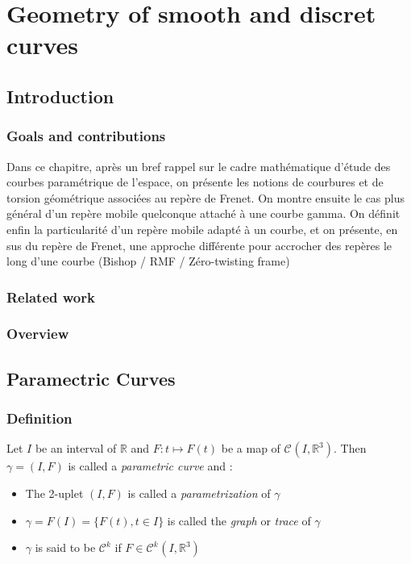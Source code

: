 \chapter{Geometry of smooth and discret curves}
\section{Introduction}

\subsection{Goals and contributions}
Dans ce chapitre, après un bref rappel sur le cadre mathématique d'étude des courbes paramétrique de l'espace, on présente les notions de courbures et de torsion géométrique associées au repère de Frenet. On montre ensuite le cas plus général d'un repère mobile quelconque attaché à une courbe gamma. On définit enfin la particularité d'un repère mobile adapté à un courbe, et on présente, en sus du repère de Frenet, une approche différente pour accrocher des repères le long d'une courbe (Bishop / RMF / Zéro-twisting frame)

\subsection{Related work}
%

\subsection{Overview}



\section{Paramectric Curves}

\subsection{Definition}
Let $I$ be an interval of $\mathbb{R}$ and $F\colon t \mapsto F(t)$ be a map of ${\mathcal{C}}^{}(I,{\mathbb{R}}^3)$. Then $\gamma=(I,F)$ is called a \emph{parametric curve} and :
\begin{itemize}
\item The 2-uplet $(I,F)$ is called a \emph{parametrization} of $\gamma$
\item $\gamma = F(I) = \{F(t), t \in I\}$ is called the \emph{graph} or \emph{trace} of $\gamma$
\item $\gamma$ is said to be ${\mathcal{C}}^{k}$ if $F \in {\mathcal{C}^{k}}^{}(I,{\mathbb{R}}^3)$
\end{itemize}

